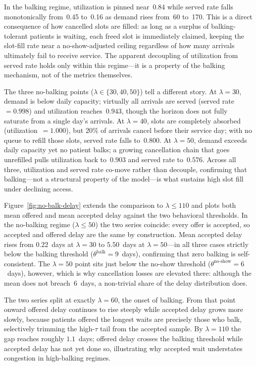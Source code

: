 \documentclass[11pt]{article}
\begin{document}
In the balking regime, utilization is pinned near~0.84 while served rate falls
monotonically from~0.45 to~0.16 as demand rises from~60 to~170. This is a
direct consequence of how cancelled slots are filled: as long as a surplus of
balking-tolerant patients is waiting, each freed slot is immediately claimed,
keeping the slot-fill rate near a no-show-adjusted ceiling regardless of how
many arrivals ultimately fail to receive service. The apparent decoupling of
utilization from served rate holds only within this regime---it is a property
of the balking mechanism, not of the metrics themselves.

The three no-balking points ($\lambda \in \{30, 40, 50\}$) tell a different
story. At $\lambda = 30$, demand is below daily capacity; virtually all
arrivals are served (served rate~$= 0.998$) and utilization reaches~$0.943$,
though the horizon does not fully saturate from a single day's arrivals.
At $\lambda = 40$, slots are completely absorbed (utilization~$= 1.000$), but
20\% of arrivals cancel before their service day; with no queue to refill
those slots, served rate falls to~$0.800$. At $\lambda = 50$, demand exceeds
daily capacity yet no patient balks; a growing cancellation chain that goes
unrefilled pulls utilization back to~$0.903$ and served rate to~$0.576$.
Across all three, utilization and served rate co-move rather than decouple,
confirming that balking---not a structural property of the model---is what
sustains high slot fill under declining access.

Figure~\ref{fig:no-balk-delay} extends the comparison to $\lambda \leq 110$
and plots both mean offered and mean accepted delay against the two
behavioral thresholds. In the no-balking regime ($\lambda \leq 50$) the two
series coincide: every offer is accepted, so accepted and offered delay are
the same by construction. Mean accepted delay rises from $0.22$~days at
$\lambda = 30$ to $5.50$~days at $\lambda = 50$---in all three cases
strictly below the balking threshold ($\theta^{\text{balk}} = 9$~days),
confirming that zero balking is self-consistent. The $\lambda = 50$ point
sits just below the no-show threshold ($\theta^{\text{no-show}} = 6$~days),
however, which is why cancellation losses are elevated there: although the
mean does not breach~$6$~days, a non-trivial share of the delay
distribution does.

The two series split at exactly $\lambda = 60$, the onset of balking.
From that point onward offered delay continues to rise steeply while accepted
delay grows more slowly, because patients offered the longest waits are
precisely those who balk, selectively trimming the high-$\tau$ tail from the
accepted sample. By $\lambda = 110$ the gap reaches roughly $1.1$~days;
offered delay crosses the balking threshold while accepted delay has not yet
done so, illustrating why accepted wait understates congestion in
high-balking regimes.
\end{document}
